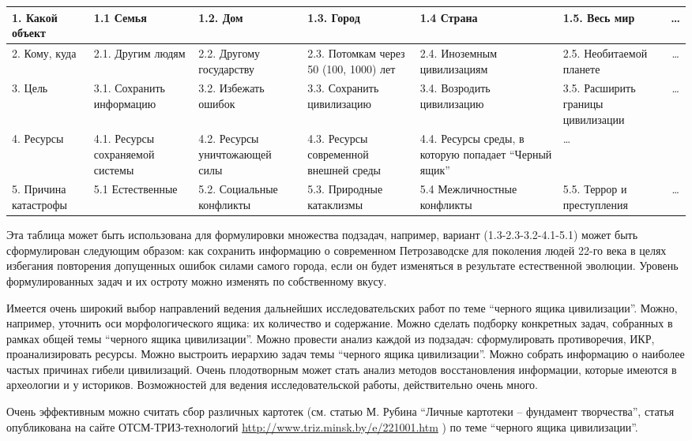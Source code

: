 \documentclass[11pt,a4paper]{article}
\begin{document}
\begin{center}\small
  \begin{tabular}{|*{6}{>{\raggedright}p{1.9cm}|}c|}\hline
1. Какой объект & 1.1 Семья & 1.2. Дом & 1.3. Город & 1.4 Страна & 1.5. Весь
мир & \ldots \\\hline
2. Кому, куда & 2.1. Другим людям & 2.2. Другому государству & 2.3. Потомкам
через 50 (100, 1000) лет & 2.4. Иноземным цивилизациям & 2.5. Необитаемой
планете & \ldots \\\hline
3. Цель & 3.1. Сохранить информацию & 3.2. Избежать ошибок & 3.3. Сохранить
цивилизацию & 3.4. Возродить цивилизацию & 3.5. Расширить границы цивилизации
& \ldots \\\hline
4. Ресурсы & 4.1. Ресурсы сохраняемой системы & 4.2. Ресурсы уничтожающей силы
& 4.3. Ресурсы современной внешней среды & 4.4. Ресурсы среды, в которую
попадает “Черный ящик” & \ldots & \\\hline 
5. Причина катастрофы & 5.1 Естественные & 5.2. Социальные конфликты &
5.3. Природные катаклизмы & 5.4 Межличностные конфликты & 5.5. Террор и
преступления & \ldots \\\hline
  \end{tabular}
\end{center}
Эта таблица может быть использована для формулировки множества подзадач,
например, вариант (1.3-2.3-3.2-4.1-5.1) может быть сформулирован следующим
образом: как сохранить информацию о современном Петрозаводске для поколения
людей 22-го века в целях избегания повторения допущенных ошибок силами самого
города, если он будет изменяться в результате естественной эволюции. Уровень
формулированных задач и их остроту можно изменять по собственному вкусу.

Имеется очень широкий выбор направлений ведения дальнейших исследовательских
работ по теме “черного ящика цивилизации”. Можно, например, уточнить оси
морфологического ящика: их количество и содержание. Можно сделать подборку
конкретных задач, собранных в рамках общей темы “черного ящика
цивилизации”. Можно провести анализ каждой из подзадач: сформулировать
противоречия, ИКР, проанализировать ресурсы. Можно выстроить иерархию задач
темы “черного ящика цивилизации”. Можно собрать информацию о наиболее частых
причинах гибели цивилизаций. Очень плодотворным может стать анализ методов
восстановления информации, которые имеются в археологии и у
историков. Возможностей для ведения исследовательской работы, действительно
очень много.

Очень эффективным можно считать сбор различных картотек (см. статью М. Рубина
“Личные картотеки – фундамент творчества”, статья опубликована на сайте
ОТСМ-ТРИЗ-технологий  \url{http://www.triz.minsk.by/e/221001.htm} ) по теме
“черного ящика цивилизации”.
\end{document}
